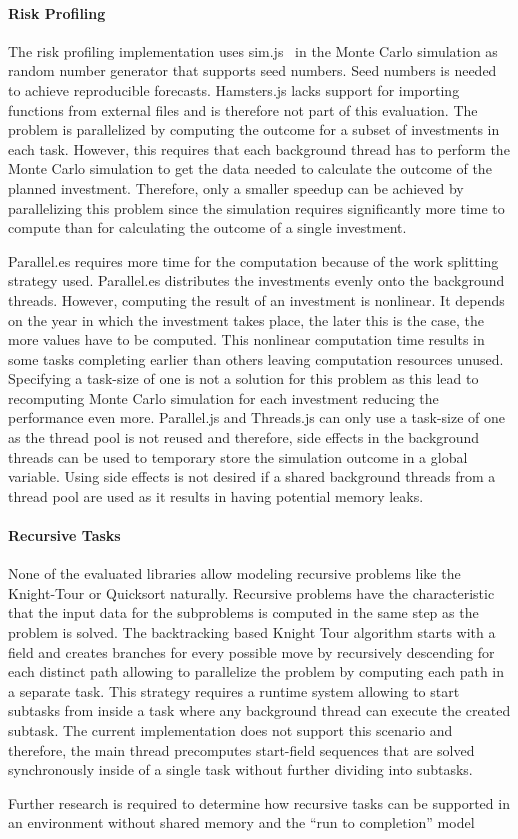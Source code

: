 \paragraph{Risk Profiling}
The risk profiling implementation uses sim.js~\cite{simjs} in the Monte Carlo simulation as random number generator that supports seed numbers. Seed numbers is needed to achieve reproducible forecasts. Hamsters.js lacks support for importing functions from external files and is therefore not part of this evaluation. The problem is parallelized by computing the outcome for a subset of investments in each task. However, this requires that each background thread has to perform the Monte Carlo simulation to get the data needed to calculate the outcome of the planned investment. Therefore, only a smaller speedup can be achieved by parallelizing this problem since the simulation requires significantly more time to compute than for calculating the outcome of a single investment. 

Parallel.es requires more time for the computation because of the work splitting strategy used. Parallel.es distributes the investments evenly onto the background threads. However, computing the result of an investment is nonlinear. It depends on the year in which the investment takes place, the later this is the case, the more values have to be computed. This nonlinear computation time results in some tasks completing earlier than others leaving computation resources unused. Specifying a task-size of one is not a solution for this problem as this lead to recomputing Monte Carlo simulation for each investment reducing the performance even more. Parallel.js and Threads.js can only use a task-size of one as the thread pool is not reused and therefore, side effects in the background threads can be used to temporary store the simulation outcome in a global variable. Using side effects is not desired if a shared background threads from a thread pool are used as it results in having potential memory leaks.

\paragraph{Recursive Tasks} 

None of the evaluated libraries allow modeling recursive problems like the Knight-Tour or Quicksort naturally. Recursive problems have the characteristic that the input data for the subproblems is computed in the same step as the problem is solved. The backtracking based Knight Tour algorithm starts with a field and creates branches for every possible move by recursively descending for each distinct path allowing to parallelize the problem by computing each path in a separate task.  This strategy requires a runtime system allowing to start subtasks from inside a task where any background thread can execute the created subtask. The current implementation does not support this scenario and therefore, the main thread precomputes start-field sequences that are solved synchronously inside of a single task without further dividing into subtasks.

Further research is required to determine how recursive tasks can be supported in an environment without shared memory and the \enquote{run to completion} model